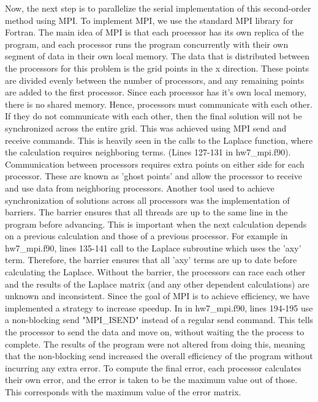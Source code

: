 \documentclass[12pt]{article}
\begin{document}
	Now, the next step is to parallelize the serial implementation of this second-order method using MPI. To implement MPI, we use the standard MPI library for Fortran. The main idea of MPI is that each processor has its own replica of the program, and each processor runs the program concurrently with their own segment of data in their own local memory. The data that is distributed between the processors for this problem is the grid points in the x direction. These points are divided evenly between the number of processors, and any remaining points are added to the first processor. Since each processor has it's own local memory, there is no shared memory. Hence, processors must communicate with each other. If they do not communicate with each other, then the final solution will not be synchronized across the entire grid. This was achieved using MPI send and receive commands. This is heavily seen in the calls to the Laplace function, where the calculation requires neighboring terms. (Lines 127-131 in hw7\_mpi.f90). Communication between processors requires extra points on either side for each processor. These are known as 'ghost points' and allow the processor to receive and use data from neighboring processors. 
\newline \newline
	Another tool used to achieve synchronization of solutions across all processors was the implementation of barriers. The barrier ensures that all threads are up to the same line in the program before advancing. This is important when the next calculation depends on a previous calculation and those of a previous processor. For example in hw7\_mpi.f90, lines 135-141 call to the Laplace subroutine which uses the 'axy' term. Therefore, the barrier ensures that all 'axy' terms are up to date before calculating the Laplace. Without the barrier, the processors can race each other and the results of the Laplace matrix (and any other dependent calculations) are unknown and inconsistent.
\newline \newline
	Since the goal of MPI is to achieve efficiency, we have implemented a strategy to increase speedup. In in hw7\_mpi.f90, lines 194-195 use a non-blocking send "MPI\_ISEND" instead of a regular send command. This tells the processor to send the data and move on, without waiting the the process to complete. The results of the program were not altered from doing this, meaning that the non-blocking send increased the overall efficiency of the program without incurring any extra error. To compute the final error, each processor calculates their own error, and the error is taken to be the maximum value out of those. This corresponds with the maximum value of the error matrix. 
\end{document}
